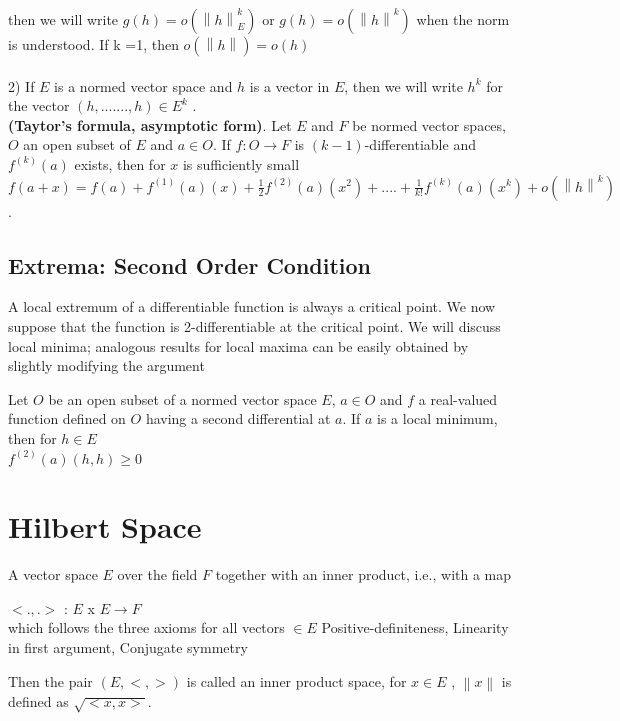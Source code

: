 \documentclass[12 pt]{article}
\theoremstyle{definition}
\theoremstyle{remark}
\newcommand\norm[1]{\left\lVert#1\right\rVert}
\begin{document}
then we will write $g(h) = o(\norm{h}_E^k)$ or $g(h) = o(\norm{h}^k)$ when the norm is understood. If k =1, then $o(\norm{h}) = o(h)$\\~\\

2) If $E$ is a normed vector space and $h$ is a vector in $E$, then we will write $h^k$ for
the vector $(h,.......,h) \in E^k$ .\\

\theorem \textbf{(Taytor's formula, asymptotic form)}. Let $E$ and $F$ be normed vector spaces, $O$ an open subset of $E$ and $a \in O$. If $f: O \to F$ is $(k-1)$-differentiable and $f^{(k)}(a)$ exists, then for $x$ is sufficiently small \\
\qquad $ f(a+x) = f(a)  + f^{(1)}(a)(x) + \frac{1}{2} f^{(2)}(a)(x^2) +....+\frac{1}{k!} f^{(k)}(a)(x^k) + o(\norm{h}^k)$.

\subsection{Extrema: Second Order Condition}
\normalfont

A local extremum of a differentiable function is always a critical point. We now suppose that the function is 2-differentiable at the critical point. We will discuss local minima; analogous results for local maxima can be easily obtained by slightly modifying the argument

\proposition Let $O$ be an open subset of a normed vector space $E$, $a \in O$ and $f$ a real-valued function defined on $O$ having a second differential at $a$. If $a$ is a local minimum, then for $h \in E$ \\

\hspace*{4cm} $f^{(2)}(a)(h,h) \geq 0$

\section{Hilbert Space}
\normalfont
A vector space $E$ over the field $F$ together with an inner product, i.e., with a map

\hspace{2cm} $<.,.>$ : $E$ x $E \to F$ \\
which follows the three axioms for all vectors $\in E$ Positive-definiteness, Linearity in first argument, Conjugate symmetry

Then the pair $( E, <,>)$ is called an inner product space, for $x \in E$ , $\norm{x}$ is defined as $ \sqrt{ <x,x>} $.\\
\end{document}
